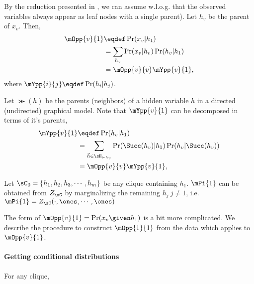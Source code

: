 By the reduction presented in , we can assume
  w.l.o.g. that the observed variables always appear as leaf nodes with a single parent). 
Let $h_v$ be the parent of $x_v$. Then, 
\begin{align*}
  \mOpp{v}{1} &\eqdef \Pr( x_v | h_1 )  \\
              &= \sum_{h_v} \Pr( x_v | h_v ) \Pr( h_v | h_1 ) \\
              &= \mOpp{v}{v} \mYpp{v}{1},
\end{align*}
where $\mYpp{i}{j} \eqdef \Pr( h_i | h_j )$. 

Let $\Succ(h)$ be the parents (neighbors) of a hidden variable $h$ in
  a directed (undirected) graphical model. 
Note that $\mYpp{v}{1}$ can be decomposed in terms of it's parents,
\begin{align*}
  \mYpp{v}{1} &\eqdef \Pr( h_v | h_1 )  \\
  &= \sum_{\vec h \in \sH_{\succ{h_v}}} \Pr( \Succ(h_v) | h_1 ) \Pr( h_v | \Succ(h_v) ) \\
              &= \mOpp{v}{v} \mYpp{v}{1},
\end{align*}


Let $\sC_0 = \{h_1, h_2, h_3, \cdots, h_m\}$ be any clique containing
  $h_1$. $\mPi{1}$ can be obtained from $Z_\sC$ by marginalizing the
  remaining $h_j ~ j \neq 1$, i.e. $\mPi{1} = Z_\sC(\cdot, \ones, \cdots,
  \ones)$ 

The form of $\mOpp{v}{1} = \Pr(x_v \given h_1)$ is a bit more
  complicated. 
We describe the procedure to construct $\mOpp{1}{1}$ from the data which applies to   $\mOpp{v}{1}$.


\paragraph{Getting conditional distributions}

For any clique, 


\subsection{}
%
%
%
%

